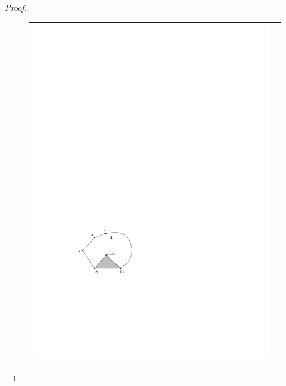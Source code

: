 \documentclass[preprint, 12pt]{elsarticle}
\begin{document}
\begin{proof}
\begin{figure}[htbp]
  \begin{center}
    \begin{tabular}{cc}
      \includegraphics{pics/inductive} &

\end{tabular}
\end{center}
\end{figure}
\end{proof}
\end{document}
